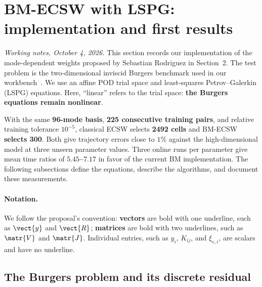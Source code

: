 \clearpage
\begingroup
\setlength{\emergencystretch}{1.5em}
\section{BM-ECSW with LSPG: implementation and first results}
\label{sec:implementation}

\textit{Working notes, October 4, 2026.} This section records our implementation of the mode-dependent weights proposed by Sebastian Rodriguez in Section~2. The test problem is the two-dimensional inviscid Burgers benchmark used in our workbench~\cite{impl-barnett2023}. We use an affine POD trial space and least-squares Petrov--Galerkin (LSPG) equations. Here, ``linear'' refers to the trial space: \textbf{the Burgers equations remain nonlinear}.

With the same \textbf{96-mode basis}, \textbf{225 consecutive training pairs}, and relative training tolerance $10^{-5}$, classical ECSW selects \textbf{2492 cells} and BM-ECSW \textbf{selects 300}. Both give trajectory errors close to $1\%$ against the high-dimensional model at three unseen parameter values. Three online runs per parameter give mean time ratios of \textbf{$5.45$--$7.17$} in favor of the current BM implementation. The following subsections define the equations, describe the algorithms, and document these measurements.

\paragraph{Notation.}
We follow the proposal's convention: \textbf{vectors} are bold with one underline, such as $\vect{y}$ and $\vect{R}$; \textbf{matrices} are bold with two underlines, such as $\matr{V}$ and $\matr{J}$. Individual entries, such as $y_i$, $K_{ij}$, and $\xi_{e,i}$, are scalars and have no underline.

\subsection{The Burgers problem and its discrete residual}
\label{sec:impl-burgers}

